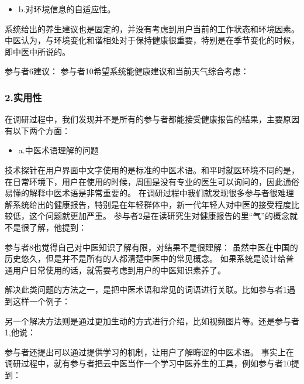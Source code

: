 \begin{itemize}
\item b.对环境信息的自适应性。
\end{itemize}

系统给出的养生建议也是固定的，并没有考虑到用户当前的工作状态和环境因素。中医认为，与环境变化和谐相处对于保持健康很重要，特别是在季节变化的时候，即中医中所说的。

参与者6建议： 
参与者10希望系统能健康建议和当前天气综合考虑：


\subsubsection{2.实用性}
在调研过程中，我们发现并不是所有的参与者都能接受健康报告的结果，主要原因有以下两个方面：

\begin{itemize}
\item a.中医术语理解的问题
\end{itemize}

技术探针在用户界面中文字使用的是标准的中医术语。和平时就医环境不同的是，在日常环境下，用户在使用的时候，周围是没有专业的医生可以询问的，因此通俗易懂的解释中医术语是非常重要的。
在调研过程中我们就发现很多参与者很难理解系统给出的健康报告，特别是在年轻群体中，新一代年轻人对中医的接受程度比较低，这个问题就更加严重。
参与者2是在读研究生对健康报告的里“气”的概念就不是很了解，他提到：

参与者8也觉得自己对中医知识了解有限，对结果不是很理解：
虽然中医在中国的历史悠久，但是并不是所有的人都清楚中医中的常见概念。 如果系统是设计给普通用户日常使用的话，就需要考虑到用户的中医知识素养了。

解决此类问题的方法之一，是把中医术语和常见的词语进行关联。比如参与者1遇到这样一个例子：

另一个解决方法则是通过更加生动的方式进行介绍，比如视频图片等。还是参与者1,他说：

参与者还提出可以通过提供学习的机制，让用户了解晦涩的中医术语。
事实上在调研过程中，就有参与者把云中医当作一个学习中医养生的工具，例如参与者10提到：

